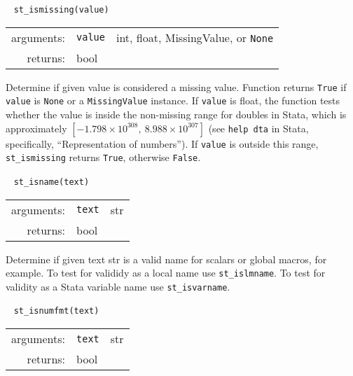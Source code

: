\documentclass{article}
\begin{document}
			
			\ \newline
			\noindent \lstinline$st_ismissing(value)$
								
			\vspace{1.5mm}
			\noindent 
			\indent \begin{tabular}{rrl}
					arguments: & \texttt{value} & int, float, MissingValue, or \texttt{None} \\
					returns: & \multicolumn{2}{l}{bool}
				\end{tabular}
								
			\vspace{1.5mm}
			\noindent Determine if given value is considered a missing value. Function returns \lstinline{True} if \lstinline{value} is \lstinline{None} or a \lstinline{MissingValue} instance. If \lstinline{value} is float, the function tests whether the value is inside the non-missing range for doubles in Stata, which is approximately $[-1.798 \times 10^{308},\ 8.988 \times 10^{307}]$ (see \lstinline{help dta} in Stata, specifically, ``Representation of numbers''). If \lstinline{value} is outside this range, \lstinline{st_ismissing} returns \lstinline{True}, otherwise \lstinline{False}. \newline
		
			
			\ \newline
			\noindent \lstinline$st_isname(text)$
								
			\vspace{1.5mm}
			\noindent 
			\indent \begin{tabular}{rrl}
					arguments: & \texttt{text} & str \\
					returns: & \multicolumn{2}{l}{bool}
				\end{tabular}
								
			\vspace{1.5mm}
			\noindent Determine if given text str is a valid name for scalars or global macros, for example. To test for valididy as a local name use \lstinline$st_islmname$. To test for validity as a Stata variable name use \lstinline$st_isvarname$. \newline
			
			
			\ \newline
			\noindent \lstinline$st_isnumfmt(text)$
								
			\vspace{1.5mm}
			\noindent 
			\indent \begin{tabular}{rrl}
					arguments: & \texttt{text} & str \\
					returns: & \multicolumn{2}{l}{bool}
				\end{tabular}
								
\end{document}
